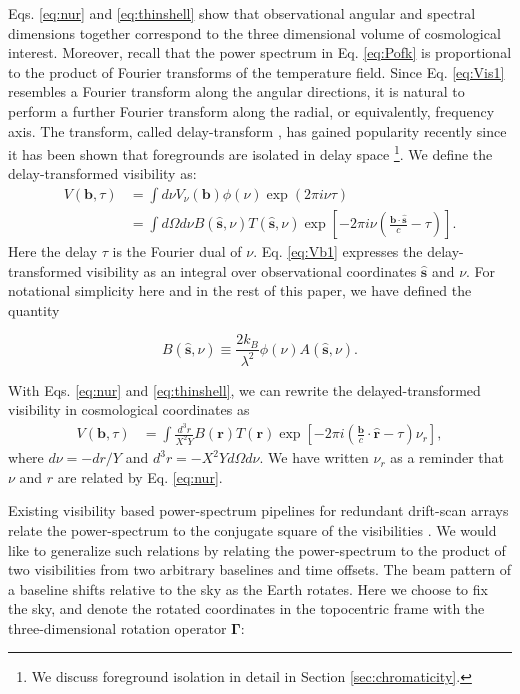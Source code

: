 \documentclass[twocolumn,apj,numberedappendix]{emulateapj}
\renewcommand\[{\begin{equation}}
\renewcommand\]{\end{equation}}
\begin{document}
 
Eqs. \eqref{eq:nur} and \eqref{eq:thinshell} show that observational angular and spectral dimensions together correspond to the three dimensional volume of cosmological interest. Moreover, recall that the power spectrum in Eq. \eqref{eq:Pofk} is proportional to the product of Fourier transforms of the temperature field. Since Eq. \eqref{eq:Vis1} resembles a Fourier transform along the angular directions, it is natural to perform a further Fourier transform along the radial, or equivalently, frequency axis. The transform, called delay-transform \citep{delay-transform}, has gained popularity recently since it has been shown that foregrounds are isolated in delay space \footnote{We discuss foreground isolation in detail in Section \ref{sec:chromaticity}.}. We define the delay-transformed visibility as:
\small
\begin{equation}
\begin{aligned}V(\boldsymbol{b},\tau) & =\int d\nu V_{\nu}(\boldsymbol{b})\phi(\nu)\exp\left(2\pi i\nu\tau\right)\\
 & =\int d\Omega d\nu B(\hat{\boldsymbol{s}},\nu)T(\hat{\boldsymbol{s}},\nu)\exp\left[-2\pi i\nu\left(\frac{\boldsymbol{b}\cdot\hat{\boldsymbol{s}}}{c}-\tau\right)\right]. 
\end{aligned}
\label{eq:Vb1}
\end{equation}
\normalsize
Here the delay $\tau$ is the Fourier dual of $\nu$. Eq. \eqref{eq:Vb1} expresses the delay-transformed visibility as
an integral over observational coordinates $\hat{\boldsymbol{s}}$ and $\nu$. For notational simplicity here and in the rest of this paper, we have defined the quantity

\[
B(\hat{\boldsymbol{s}},\nu) \equiv \frac{2k_B}{\lambda^2}\phi(\nu)A(\hat{\boldsymbol{s}},\nu). 
\label{eq:B}
\]

With Eqs. \eqref{eq:nur} and \eqref{eq:thinshell}, we can rewrite the delayed-transformed visibility in cosmological coordinates as 
\small
\[
\begin{aligned}V(\boldsymbol{b},\tau) & =\int\frac{d^{3}r}{X^{2}Y}B(\boldsymbol{r})T(\boldsymbol{r})\exp\left[-2\pi i\left(\frac{\boldsymbol{b}}{c}\cdot\hat{\boldsymbol{r}}-\tau\right)\nu_{r}\right],
\end{aligned}
\]
\normalsize
where $d\nu=-dr/Y$ and $d^{3}r=-X^{2}Yd\Omega d\nu$. 
We have written $\nu_{r}$ as a reminder that $\nu$ and $r$ are related
by Eq. \eqref{eq:nur}. 

Existing visibility based power-spectrum pipelines for redundant drift-scan  arrays relate the power-spectrum to the conjugate square of the visibilities \citep{delay-transform, paper32, Ali2015}. We would like to generalize such relations by relating the power-spectrum to the product of two visibilities from two arbitrary baselines and time offsets. 
The beam pattern of a baseline shifts relative to the sky as the Earth rotates. Here we choose to fix the sky, and denote the rotated coordinates
in the topocentric frame with the three-dimensional rotation operator $\boldsymbol{\Gamma}$:
\end{document}
